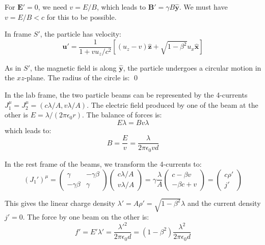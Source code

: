 \documentclass[12pt]{article}
\begin{document}
For $\mathbf{E}' = 0$, we need $v = E/B$, which leads to $\mathbf{B}' = \gamma B \hat{\mathbf{y}}$. We must have $v = E/B < c$ for this to be possible.

In frame $S'$, the particle has velocity:
\begin{equation}
    \mathbf{u}' = \frac{1}{1 + vu_{z}/c^{2}} \left[ (u_{z} - v) \hat{\mathbf{z}} + \sqrt{1 - \beta^{2}} u_{x} \hat{\mathbf{x}} \right]
\end{equation}

As in $S'$, the magnetic field is along $\hat{\mathbf{y}}$, the particle undergoes a circular motion in the $xz$-plane. The radius of the circle is:
\qed



In the lab frame, the two particle beams can be represented by the 4-currents $J_{1}^{\mu} = J_{2}^{\mu} = (c\lambda/A, v\lambda/A)$. The electric field produced by one of the beam at the other is $E = \lambda/(2\pi\epsilon_{0}r)$. The balance of forces is:
\begin{equation}
    E\lambda = Bv\lambda
\end{equation}
which leads to:
\begin{equation}
    B = \frac{E}{v} = \frac{\lambda}{2\pi\epsilon_{0}vd}
\end{equation}

In the rest frame of the beams, we transform the 4-currents to:
\begin{equation}
    (J_{1}')^{\mu} =
    \begin{pmatrix}
        \gamma        & -\gamma \beta \\
        -\gamma \beta & \gamma
    \end{pmatrix}
    \begin{pmatrix}
        c\lambda/A \\
        v\lambda/A
    \end{pmatrix}
    =
    \gamma \frac{\lambda}{A}
    \begin{pmatrix}
        c - \beta v \\
        -\beta c + v
    \end{pmatrix}
    =
    \begin{pmatrix}
        c \rho' \\
        j'
    \end{pmatrix}
\end{equation}

This gives the linear charge density $\lambda' = A \rho' = \sqrt{1 - \beta^{2}} \lambda$ and the current density $j' = 0$. The force by one beam on the other is:
\begin{equation}
    f' = E' \lambda' = \frac{\lambda'^{2}}{2\pi\epsilon_{0}d} = (1 - \beta^{2}) \frac{\lambda^{2}}{2\pi\epsilon_{0}d}
\end{equation}
\end{document}

